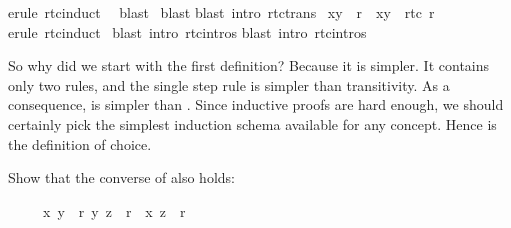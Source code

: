 \begin{isabellebody}
erule\ rtc{}{\isachardot}induct{\isacharparenright}\isanewline
\ \ blast{\isacharparenright}\isanewline
\ blast{\isacharparenright}\isanewline
{}blast\ intro{\isacharcolon}\ rtc{\isacharunderscore}trans{\isacharparenright}\isanewline
{}\isanewline
\isanewline
{}\ {\isachardoublequote}{\isacharparenleft}x{\isacharcomma}y{\isacharparenright}\ {\isasymin}\ r{\isacharasterisk}\ {\isasymLongrightarrow}\ {\isacharparenleft}x{\isacharcomma}y{\isacharparenright}\ {\isasymin}\ rtc{}\ r{\isachardoublequote}\isanewline
{}erule\ rtc{\isachardot}induct{\isacharparenright}\isanewline
\ blast\ intro{\isacharcolon}\ rtc{}{\isachardot}intros{\isacharparenright}\isanewline
{}blast\ intro{\isacharcolon}\ rtc{}{\isachardot}intros{\isacharparenright}\isanewline
{}%
\begin{isamarkuptext}%
So why did we start with the first definition? Because it is simpler. It
contains only two rules, and the single step rule is simpler than
transitivity.  As a consequence,  is simpler than
. Since inductive proofs are hard enough, we should
certainly pick the simplest induction schema available for any concept.
Hence  is the definition of choice.

\begin{exercise}
Show that the converse of  also holds:
\begin{isabelle}%
\ \ \ \ \ {\isasymlbrakk}{\isacharparenleft}x{\isacharcomma}\ y{\isacharparenright}\ {\isasymin}\ r{\isacharasterisk}{\isacharsemicolon}\ {\isacharparenleft}y{\isacharcomma}\ z{\isacharparenright}\ {\isasymin}\ r{\isasymrbrakk}\ {\isasymLongrightarrow}\ {\isacharparenleft}x{\isacharcomma}\ z{\isacharparenright}\ {\isasymin}\ r{\isacharasterisk}%
\end{isabelle}
\end{exercise}%
\end{isamarkuptext}%
\end{isabellebody}%
